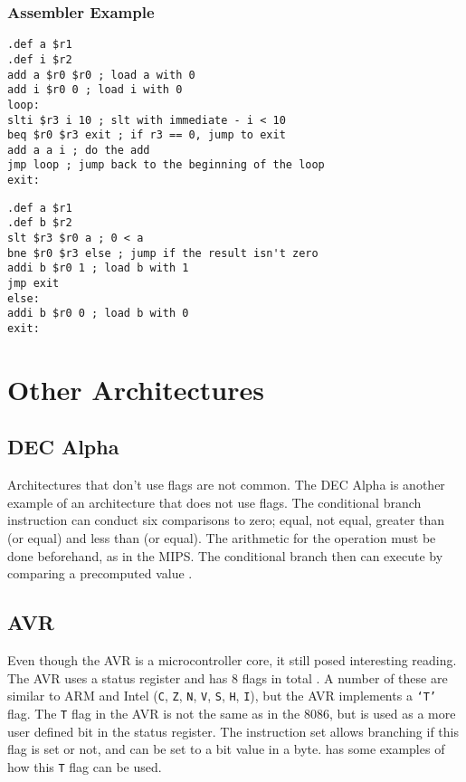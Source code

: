 \documentclass[12pt,a4paper]{article}
\begin{document}
\begin{bibunit}[is-unsrt]
\subsubsection{Assembler Example}
\begin{lstlisting}[frame=single,caption=MIPS assembler for listing \ref{ListC},label=mips1]
.def a $r1
.def i $r2
add a $r0 $r0 ; load a with 0
add i $r0 0 ; load i with 0
loop:
slti $r3 i 10 ; slt with immediate - i < 10
beq $r0 $r3 exit ; if r3 == 0, jump to exit
add a a i ; do the add
jmp loop ; jump back to the beginning of the loop
exit:
\end{lstlisting}
\begin{lstlisting}[frame=single,caption=MIPS assembler for listing \ref{ListC2},label=mips2]
.def a $r1
.def b $r2
slt $r3 $r0 a ; 0 < a
bne $r0 $r3 else ; jump if the result isn't zero
addi b $r0 1 ; load b with 1
jmp exit
else:
addi b $r0 0 ; load b with 0
exit:
\end{lstlisting}
%  

\section{Other Architectures}
\subsection{DEC Alpha}

Architectures that don't use flags are not common. 
The DEC Alpha is another example of an architecture that does not use flags.
The conditional branch instruction can conduct six comparisons to zero; equal, not equal, greater than (or equal) and less than (or equal).
The arithmetic for the operation must be done beforehand, as in the MIPS.
The conditional branch then can execute by comparing a precomputed value \cite{decalpha}. 


\subsection{AVR}
Even though the AVR is a microcontroller core, it still posed interesting reading. 
The AVR uses a status register and has 8 flags in total \cite{atmel:instructions}.
A number of these are similar to ARM and Intel (\texttt{C}, \texttt{Z}, \texttt{N}, \texttt{V}, \texttt{S}, \texttt{H}, \texttt{I}), but the AVR implements a \texttt{`T'} flag.
The \texttt{T} flag in the AVR is not the same as in the 8086, but is used as a more user defined bit in the status register.
The instruction set allows branching if this flag is set or not, and can be set to a bit value in a byte. 
\cite{avr:asm} has some examples of how this \texttt{T} flag can be used.



\end{bibunit}
\end{document}

